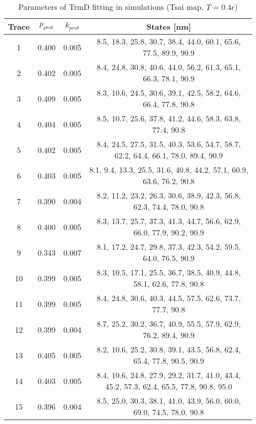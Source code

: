 \begin{table}
    \tiny
    \centering
    \caption{Parameters of TrmD fitting in simulations (Tsai map, $T=0.4\epsilon$)}
    \label{tab:trmd-pc-parameters}
    \begin{tabular}{c|c|c|c}
        \textbf{Trace} & \textbf{$p_{prot}$} & \textbf{$k_{prot}$} & \textbf{States [nm]}\\\hline
        1 & 0.400 & 0.005 & 8.5, 18.3, 25.8, 30.7, 38.4, 44.0, 60.1, 65.6, 77.5, 89.9, 90.9\\
        2 & 0.402 & 0.005 & 8.4, 24.8, 30.8, 40.6, 44.0, 56.2, 61.3, 65.1, 66.3, 78.1, 90.9\\
        3 & 0.409 & 0.005 & 8.3, 10.6, 24.5, 30.6, 39.1, 42.5, 58.2, 64.6, 66.4, 77.8, 90.8\\
        4 & 0.404 & 0.005 & 8.5, 10.7, 25.6, 37.8, 41.2, 44.6, 58.3, 63.8, 77.4, 90.8\\
        5 & 0.402 & 0.005 & 8.4, 24.5, 27.5, 31.5, 40.3, 53.6, 54.7, 58.7, 62.2, 64.4, 66.1, 78.0, 89.4, 90.9\\
        6 & 0.403 & 0.005 & 8.1, 9.4, 13.3, 25.5, 31.6, 40.8, 44.2, 57.1, 60.9, 63.6, 76.2, 90.8\\
        7 & 0.390 & 0.004 & 8.2, 11.2, 23.2, 26.3, 30.6, 38.9, 42.3, 56.8, 62.3, 74.4, 78.0, 90.8\\
        8 & 0.400 & 0.005 & 8.3, 13.7, 25.7, 37.3, 41.3, 44.7, 56.6, 62.9, 66.0, 77.9, 90.2, 90.9\\
        9 & 0.343 & 0.007 & 8.1, 17.2, 24.7, 29.8, 37.3, 42.3, 54.2, 59.5, 64.0, 76.5, 90.9\\
        10 & 0.399 & 0.005 & 8.3, 10.5, 17.1, 25.5, 36.7, 38.5, 40.9, 44.8, 58.1, 62.6, 77.8, 90.8\\
        11 & 0.399 & 0.005 & 8.4, 24.8, 30.6, 40.3, 44.5, 57.5, 62.6, 73.7, 77.7, 90.8\\
        12 & 0.399 & 0.004 & 8.7, 25.2, 30.2, 36.7, 40.9, 55.5, 57.9, 62.9, 76.2, 89.4, 90.9\\
        13 & 0.405 & 0.005 & 8.2, 10.6, 25.2, 30.8, 39.1, 43.5, 56.8, 62.4, 65.4, 77.8, 90.5, 90.9\\
        14 & 0.403 & 0.005 & 8.4, 10.6, 24.8, 27.9, 29.2, 31.7, 41.0, 43.4, 45.2, 57.3, 62.4, 65.5, 77.8, 90.8, 95.0\\
        15 & 0.396 & 0.004 & 8.5, 25.0, 30.3, 38.1, 41.0, 43.9, 56.0, 60.0, 69.0, 74.5, 78.0, 90.8\\\hline
    \end{tabular}
\end{table}

